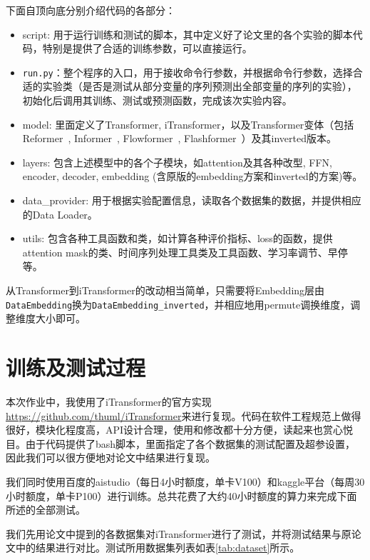 \documentclass[twoside,12pt]{article}
\begin{document}
下面自顶向底分别介绍代码的各部分：
\begin{itemize}
  \item script: 用于运行训练和测试的脚本，其中定义好了论文里的各个实验的脚本代码，特别是提供了合适的训练参数，可以直接运行。
  \item \verb |run.py|：整个程序的入口，用于接收命令行参数，并根据命令行参数，选择合适的实验类（是否是测试从部分变量的序列预测出全部变量的序列的实验），初始化后调用其训练、测试或预测函数，完成该次实验内容。
  \item model: 里面定义了Transformer, iTransformer，以及Transformer变体（包括Reformer~\citep{kitaev2020reformer}, Informer~\citep{Informer}, Flowformer~\citep{wu2022flowformer}, Flashformer~\citep{dao2022flashattention}）及其inverted版本。
  \item layers: 包含上述模型中的各个子模块，如attention及其各种改型, FFN, encoder, decoder, embedding (含原版的embedding方案和inverted的方案)等。
  \item data\_provider: 用于根据实验配置信息，读取各个数据集的数据，并提供相应的Data Loader。
  \item utils: 包含各种工具函数和类，如计算各种评价指标、loss的函数，提供attention mask的类、时间序列处理工具类及工具函数、学习率调节、早停等。
\end{itemize}

从Transformer到iTransformer的改动相当简单，只需要将Embedding层由\verb |DataEmbedding|换为\verb |DataEmbedding_inverted|，并相应地用permute调换维度，调整维度大小即可。

\section{训练及测试过程}

本次作业中，我使用了iTransformer的官方实现\url{https://github.com/thuml/iTransformer}来进行复现。代码在软件工程规范上做得很好，模块化程度高，API设计合理，使用和修改都十分方便，读起来也赏心悦目。由于代码提供了bash脚本，里面指定了各个数据集的测试配置及超参设置，因此我们可以很方便地对论文中结果进行复现。

我们同时使用百度的aistudio（每日4小时额度，单卡V100）和kaggle平台（每周30小时额度，单卡P100）进行训练。总共花费了大约40小时额度的算力来完成下面所述的全部测试。

我们先用论文中提到的各数据集对iTransformer进行了测试，并将测试结果与原论文中的结果进行对比。测试所用数据集列表如表\ref{tab:dataset}所示。
\end{document}

